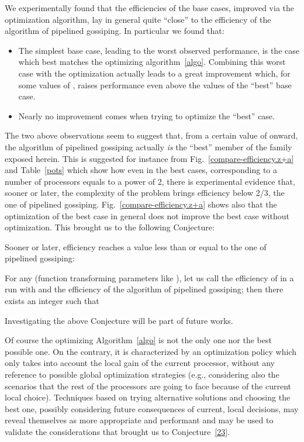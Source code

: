 \documentclass{elsart}
\begin{document}
We experimentally found that the efficiencies of the base cases,
improved via the optimization algorithm, lay in general quite ``close'' to
the efficiency of the algorithm of pipelined gossiping.
In particular we found that:
\begin{itemize}
\item The simplest base case, leading to the worst observed performance, 
      is the case which best matches the optimizing algorithm~\ref{algo}. 
      Combining this worst case with the optimization actually leads to a great 
      improvement which, for some values of , raises performance even 
      above the values of the ``best'' base case.
\item Nearly no improvement comes when trying to optimize 
      the ``best'' case.
\end{itemize}

The two above observations seem to suggest that, from
a certain value of  onward, the algorithm of
pipelined gossiping actually \emph{is\/} the ``best'' member of the
family exposed herein. This is suggested for instance from 
Fig.~\ref{compare-efficiency.z+a} and Table~\ref{pots} which show how
even in the best cases, corresponding to a number of processors
equals to a power of 2, there is experimental evidence that,
sooner or later,
the complexity of the problem brings efficiency below 2/3,
the one of pipelined gossiping.
Fig.~\ref{compare-efficiency.z+a} 
shows also that the optimization of the best case in general
does not improve the best case without optimization.
This brought us to the following Conjecture:

Sooner or later, efficiency reaches a value less than or equal to
the one of pipelined gossiping:
\begin{conj}\label{23}
For any  (function transforming parameters like ),
let us call  the efficiency of  in a run with 
and  the efficiency of the algorithm
of pipelined gossiping;
then there exists an integer  such that 
	
\end{conj}



Investigating the above Conjecture will be part of future works.

Of course the optimizing Algorithm~\ref{algo} is not the only one nor the
best possible one.  On the contrary, it is characterized by an
optimization policy which only takes into account the local gain of the
current processor, without any reference to possible global optimization
strategies (e.g., considering also the scenarios that the rest of the
processors are going to face because of the current local choice).
Techniques based on trying alternative solutions and choosing the best
one, possibly considering future consequences of current, local decisions,
may reveal themselves as more appropriate and performant and may be used
to validate the considerations that brought us to Conjecture~\ref{23}.
\end{document}
